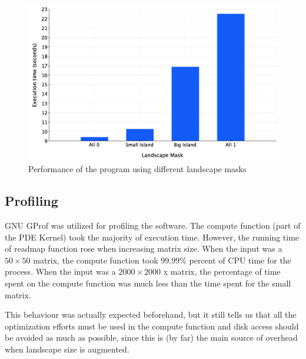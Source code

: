 \documentclass[12pt,a4paper]{article}
\begin{document}
\begin{figure}[]
    \centering
    \includegraphics[scale=0.25]{images/bargraph.png}
    \caption{Performance of the program using different landscape masks}
\end{figure}


\subsection{Profiling}

GNU GProf was utilized for profiling the software. The compute function (part of the PDE Kernel) took the majority of execution time. However, the running time of readmap function rose when increasing matrix size. When the input was a $50\times 50$ matrix, the compute function took $99.99\%$ percent of CPU time for the process. When the input was a $2000\times 2000$ x matrix, the percentage of time spent on the compute function was much less than the time spent for the small matrix. 

This behaviour was actually expected beforehand, but it still tells us that all the optimization efforts must be used in the compute function and disk access should be avoided as much as possible, since this is (by far) the main source of overhead when landscape size is augmented.
\end{document}
